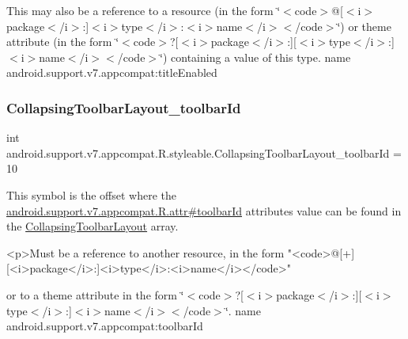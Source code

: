 This may also be a reference to a resource (in the form \char`\"{}$<$code$>$@\mbox{[}$<$i$>$package$<$/i$>$\+:\mbox{]}$<$i$>$type$<$/i$>$\+:$<$i$>$name$<$/i$>$$<$/code$>$\char`\"{}) or theme attribute (in the form \char`\"{}$<$code$>$?\mbox{[}$<$i$>$package$<$/i$>$\+:\mbox{]}\mbox{[}$<$i$>$type$<$/i$>$\+:\mbox{]}$<$i$>$name$<$/i$>$$<$/code$>$\char`\"{}) containing a value of this type.  name android.\+support.\+v7.\+appcompat\+:title\+Enabled \mbox{\label{classandroid_1_1support_1_1v7_1_1appcompat_1_1R_1_1styleable_a9b1b730dcc059136fa07007ab41fcc78}} 
\subsubsection{\texorpdfstring{Collapsing\+Toolbar\+Layout\+\_\+toolbar\+Id}{CollapsingToolbarLayout\_toolbarId}}
{\footnotesize\ttfamily int android.\+support.\+v7.\+appcompat.\+R.\+styleable.\+Collapsing\+Toolbar\+Layout\+\_\+toolbar\+Id = 10\hspace{0.3cm}{\ttfamily [static]}}

This symbol is the offset where the \hyperlink{classandroid_1_1support_1_1v7_1_1appcompat_1_1R_1_1attr_a4105f4e74aea7a62a41e49f62c057c62}{android.\+support.\+v7.\+appcompat.\+R.\+attr\#toolbar\+Id} attribute\textquotesingle{}s value can be found in the \hyperlink{classandroid_1_1support_1_1v7_1_1appcompat_1_1R_1_1styleable_a8d282d917f35e5a08dd37db243410383}{Collapsing\+Toolbar\+Layout} array.

\begin{DoxyVerb}      <p>Must be a reference to another resource, in the form "<code>@[+][<i>package</i>:]<i>type</i>:<i>name</i></code>"
\end{DoxyVerb}
 or to a theme attribute in the form \char`\"{}$<$code$>$?\mbox{[}$<$i$>$package$<$/i$>$\+:\mbox{]}\mbox{[}$<$i$>$type$<$/i$>$\+:\mbox{]}$<$i$>$name$<$/i$>$$<$/code$>$\char`\"{}.  name android.\+support.\+v7.\+appcompat\+:toolbar\+Id \mbox{\label{classandroid_1_1support_1_1v7_1_1appcompat_1_1R_1_1styleable_aa66e991e0d5dc9db5a9048c91817235f}} 
